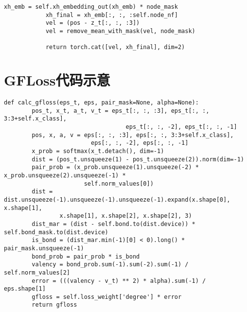 {\begin{lstlisting}[style=python]
            xh_emb = self.xh_embedding_out(xh_emb) * node_mask
            xh_final = xh_emb[:, :, :self.node_nf]
            vel = (pos - z_t[:, :, :3])
            vel = remove_mean_with_mask(vel, node_mask)
    
            return torch.cat([vel, xh_final], dim=2)
\end{lstlisting}


\section{GFLoss代码示意}

\begin{lstlisting}[style=python]
    def calc_gfloss(eps_t, eps, pair_mask=None, alpha=None):
        pos_t, x_t, a_t, v_t = eps_t[:, :, :3], eps_t[:, :, 3:3+self.x_class], 
                                   eps_t[:, :, -2], eps_t[:, :, -1]
        pos, x, a, v = eps[:, :, :3], eps[:, :, 3:3+self.x_class], 
                         eps[:, :, -2], eps[:, :, -1]
        x_prob = softmax(x_t.detach(), dim=-1)
        dist = (pos_t.unsqueeze(1) - pos_t.unsqueeze(2)).norm(dim=-1)
        pair_prob = (x_prob.unsqueeze(1).unsqueeze(-2) * x_prob.unsqueeze(2).unsqueeze(-1) *
                       self.norm_values[0])
        dist = dist.unsqueeze(-1).unsqueeze(-1).unsqueeze(-1).expand(x.shape[0], x.shape[1],
                x.shape[1], x.shape[2], x.shape[2], 3)
        dist_mar = (dist - self.bond.to(dist.device)) * self.bond_mask.to(dist.device)
        is_bond = (dist_mar.min(-1)[0] < 0).long() * pair_mask.unsqueeze(-1)
        bond_prob = pair_prob * is_bond
        valency = bond_prob.sum(-1).sum(-2).sum(-1) / self.norm_values[2]
        error = (((valency - v_t) ** 2) * alpha).sum(-1) / eps.shape[1]
        gfloss = self.loss_weight['degree'] * error
        return gfloss
\end{lstlisting}


}